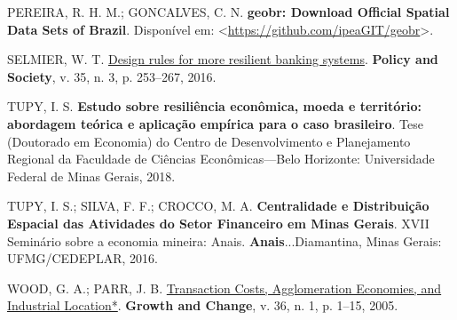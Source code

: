 \documentclass[a4paper,12pt]{article}
\newlength{\cslhangindent}
\newlength{\cslentryspacingunit} %
\newenvironment{CSLReferences}[2] %
 {%
  \setlength{\parindent}{0pt}
  \ifodd #1
  \let\oldpar\par
  \def\par{\hangindent=\cslhangindent\oldpar}
  \fi
  \setlength{\parskip}{#2\cslentryspacingunit}
 }%
 {}
\begin{document}
\begin{CSLReferences}{0}{1}
\leavevmode{}%
PEREIRA, R. H. M.; GONCALVES, C. N. \textbf{geobr: Download Official
Spatial Data Sets of Brazil}. Disponível em:
\textless{}\url{https://github.com/ipeaGIT/geobr}\textgreater.

\leavevmode{}%
SELMIER, W. T.
\href{http://dx.doi.org/10.1016/j.polsoc.2016.09.00}{Design rules for
more resilient banking systems}. \textbf{Policy and Society}, v. 35, n.
3, p. 253--267, 2016.

\leavevmode{}%
TUPY, I. S. \textbf{Estudo sobre resiliência econômica, moeda e
território: abordagem teórica e aplicação empírica para o caso
brasileiro}. Tese (Doutorado em Economia) do Centro de Desenvolvimento e
Planejamento Regional da Faculdade de Ciências Econômicas---Belo
Horizonte: Universidade Federal de Minas Gerais, 2018.

\leavevmode{}%
TUPY, I. S.; SILVA, F. F.; CROCCO, M. A. \textbf{Centralidade e
Distribuição Espacial das Atividades do Setor Financeiro em Minas
Gerais}. XVII Seminário sobre a economia mineira: Anais.
\textbf{Anais}...Diamantina, Minas Gerais: UFMG/CEDEPLAR, 2016.

\leavevmode{}%
WOOD, G. A.; PARR, J. B.
\href{https://doi.org/10.1111/j.1468-2257.2005.00264.x}{Transaction
Costs, Agglomeration Economies, and Industrial Location*}.
\textbf{Growth and Change}, v. 36, n. 1, p. 1--15, 2005.

\end{CSLReferences}
\end{document}
